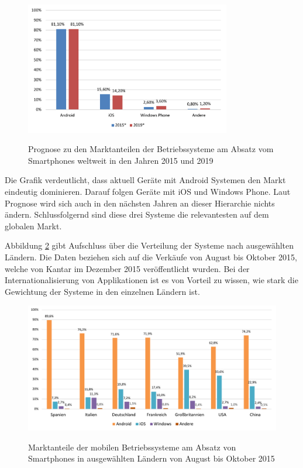 \begin{figure}[htbp]
	\centering
	\includegraphics[width=0.8\textwidth]{Bilder/Marktanteile_Betriebssysteme}
	\caption{Prognose zu den Marktanteilen der Betriebssysteme am Absatz vom Smartphones weltweit in den Jahren 2015 und 2019}\label{graph_mobile_systems}\citep{marktanteile_betriebssysteme}
\end{figure}

Die Grafik verdeutlicht, dass aktuell Geräte mit Android Systemen den Markt eindeutig dominieren. Darauf folgen Geräte mit iOS und Windows Phone. Laut Prognose wird sich auch in den nächsten Jahren an dieser Hierarchie nichts ändern. Schlussfolgernd sind diese drei Systeme die relevantesten auf dem globalen Markt.

Abbildung \ref{graph_mobile_systems_laender} gibt Aufschluss über die Verteilung der Systeme nach ausgewählten Ländern. Die Daten beziehen sich auf die Verkäufe von August bis Oktober 2015, welche von Kantar im Dezember 2015 veröffentlicht wurden. Bei der Internationalisierung von Applikationen ist es von Vorteil zu wissen, wie stark die Gewichtung der Systeme in den einzelnen Ländern ist.

\begin{figure}[htbp]
	\centering
	\includegraphics[width=1\textwidth]{Bilder/Marktanteile_nach_Laendern}
	\caption{Marktanteile der mobilen Betriebssysteme am Absatz von Smartphones in ausgewählten Ländern von August bis Oktober 2015}\label{graph_mobile_systems_laender}\citep{marktanteile_betriebssysteme_laender}
\end{figure}


